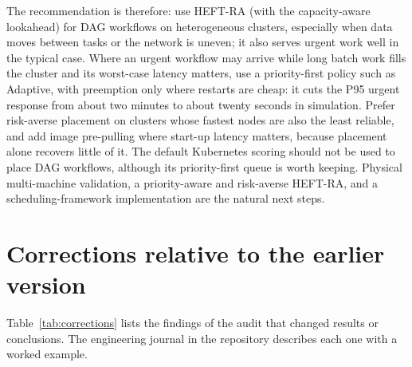 \documentclass[12pt,a4paper]{report}
\begin{document}
The recommendation is therefore: use HEFT-RA (with the capacity-aware
lookahead) for DAG workflows on heterogeneous clusters, especially when
data moves between tasks or the network is uneven; it also serves urgent
work well in the typical case. Where an urgent workflow may arrive while
long batch work fills the cluster and its worst-case latency matters, use
a priority-first policy such as Adaptive, with preemption only where
restarts are cheap: it cuts the P95 urgent response from about two minutes
to about twenty seconds in simulation. Prefer risk-averse placement on
clusters whose fastest nodes are also the least reliable, and add image
pre-pulling where start-up latency matters, because placement alone
recovers little of it. The default Kubernetes scoring should not be used
to place DAG workflows, although its priority-first queue is worth keeping.
Physical multi-machine validation, a priority-aware and risk-averse
HEFT-RA, and a scheduling-framework implementation are the natural next
steps.

\appendix

\chapter{Corrections relative to the earlier version}
\label{app:corrections}

Table~\ref{tab:corrections} lists the findings of the audit that changed
results or conclusions. The engineering journal in the repository
describes each one with a worked example.
\end{document}
